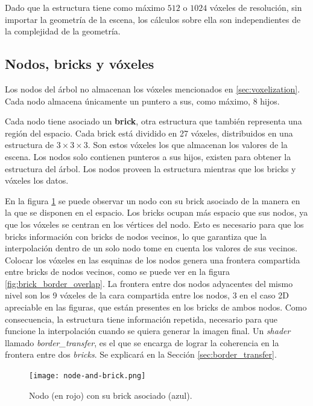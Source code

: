 Dado que la estructura tiene como máximo $512$ o $1024$ vóxeles de resolución, sin importar la geometría de la escena, los cálculos sobre ella son independientes de la complejidad de la geometría.

\subsection{Nodos, bricks y vóxeles}\label{sec:nodes_and_bricks}

Los nodos del árbol no almacenan los vóxeles mencionados en \ref{sec:voxelization}.
Cada nodo almacena únicamente un puntero a sus, como máximo, $8$ hijos.

Cada nodo tiene asociado un \textbf{brick}, otra estructura que también representa una región del espacio.
Cada brick está dividido en 27 vóxeles, distribuidos en una estructura de $3\times3\times3$.
Son estos vóxeles los que almacenan los valores de la escena.
Los nodos solo contienen punteros a sus hijos, existen para obtener la estructura del árbol.
Los nodos proveen la estructura mientras que los bricks y vóxeles los datos.

En la figura \ref{fig:node_and_brick} se puede observar un nodo con su brick asociado de la manera en la que se disponen en el espacio.
Los bricks ocupan más espacio que sus nodos, ya que los vóxeles se centran en los vértices del nodo.
Esto es necesario para que los bricks información con bricks de nodos vecinos, lo que garantiza que la interpolación dentro de un solo nodo tome en cuenta los valores de sus vecinos.
Colocar los vóxeles en las esquinas de los nodos genera una frontera compartida entre bricks de nodos vecinos, como se puede ver en la figura \ref{fig:brick_border_overlap}.
La frontera entre dos nodos adyacentes del mismo nivel son los 9 vóxeles de la cara compartida entre los nodos, 3 en el caso 2D apreciable en las figuras, que están presentes en los bricks de ambos nodos. 
Como consecuencia, la estructura tiene información repetida, necesario para que funcione la interpolación cuando se quiera generar la imagen final.
Un \textit{shader} llamado \textit{border\_transfer}, es el que se encarga de lograr la coherencia en la frontera entre dos \textit{bricks}.
Se explicará en la Sección \ref{sec:border_transfer}.

\begin{figure}[h!]
    \centering
    \texttt{[image: node-and-brick.png]}
    \caption{Nodo (en rojo) con su brick asociado (azul).}
    \label{fig:node_and_brick}
\end{figure}

